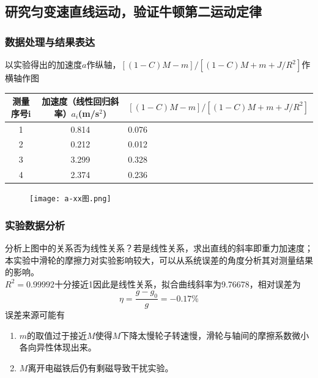 \documentclass[dvipsnames, svgnames,a4paper,11pt]{article}
\begin{document}
\subsection{研究匀变速直线运动，验证牛顿第二运动定律}
\subsubsection*{数据处理与结果表达}
\noindent 以实验得出的加速度$a$作纵轴，$[(1-C)M-m]/[(1-C)M+m+J/R^2]$作横轴作图
\begin{table}[H]
	\centering
	\begin{tabularx}{0.8\textwidth}{|c|c|X|}
		\hline
		测量序号i&加速度（线性回归斜率）$a_i$(m/s$^2$)&$[(1-C)M-m]/[(1-C)M+m+J/R^2]$\\
		\hline
		1&0.814&0.076\\
		\hline
		2&0.212&0.012\\
		\hline
		3&3.299&0.328\\
		\hline
		4&2.374&0.236\\
		\hline
	\end{tabularx}
\end{table}
\begin{figure}[H]
	\centering
	\texttt{[image: a-xx图.png]}
\end{figure}
\subsubsection*{实验数据分析}
\noindent 分析上图中的关系否为线性关系？若是线性关系，求出直线的斜率即重力加速度；本实验中滑轮的摩擦力对实验影响较大，可以从系统误差的角度分析其对测量结果的影响。\\
$R^2=0.99992$十分接近1因此是线性关系，拟合曲线斜率为9.76678，相对误差为
$$\eta=\frac{g-g_0}{g}=-0.17\%$$
误差来源可能有
\begin{enumerate}
	\item $m$的取值过于接近$M$使得$M$下降太慢轮子转速慢，滑轮与轴间的摩擦系数微小各向异性体现出来。
	\item $M$离开电磁铁后仍有剩磁导致干扰实验。
\end{enumerate}
\end{document}

